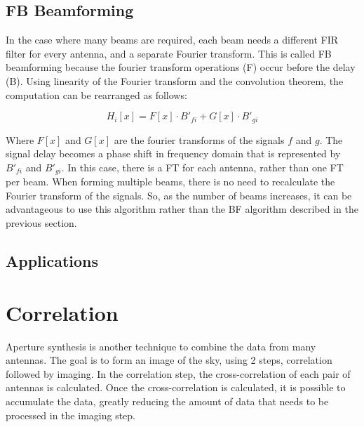 
\subsection{FB Beamforming}
In the case where many beams are required, each beam needs a different FIR filter for every antenna, and a separate Fourier transform. 
This is called FB beamforming because the fourier transform operations (F) occur before the delay (B). 
Using linearity of the Fourier transform and the convolution theorem, the computation can be rearranged as follows:

\[H_i[x] = F[x] \cdot B'_{fi} + G[x] \cdot B'_{gi}\]

Where $F[x]$ and $G[x]$ are the fourier transforms of the signals $f$ and $g$.
The signal delay becomes a phase shift in frequency domain that is represented by $B'_{fi}$ and $B'_{gi}$. 
In this case, there is a FT for each antenna, rather than one FT per beam. 
When forming multiple beams, there is no need to recalculate the Fourier transform of the signals. 
So, as the number of beams increases, it can be advantageous to use this algorithm rather than the BF algorithm described in the previous section. 

\subsection{Applications}
\cite{2012Sci...338..355D}



\cite{2012Sci...338..355D}

\section{Correlation}
\label{Real Time Radio Astronomy Algorithms:Correlation}
Aperture synthesis is another technique to combine the data from many antennas.
The goal is to form an image of the sky, using 2 steps, correlation followed by imaging.
In the correlation step, the cross-correlation of each pair of antennas is calculated. 
Once the cross-correlation is calculated, it is possible to accumulate the data, greatly reducing the amount of data that needs to be processed in the imaging step.

